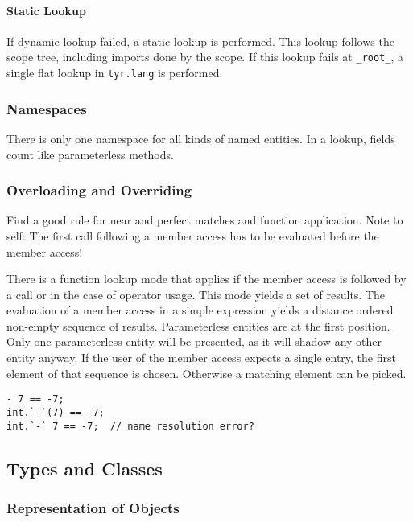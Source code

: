 \paragraph{Static Lookup} If dynamic lookup failed, a static lookup is performed.
This lookup follows the scope tree, including imports done by the scope.
If this lookup fails at \texttt{\_root\_}, a single flat lookup in \texttt{tyr.lang} is performed.


\subsubsection{Namespaces}

There is only one namespace for all kinds of named entities.
In a lookup, fields count like parameterless methods.


\subsubsection{Overloading and Overriding}

Find a good rule for near and perfect matches and function application.
Note to self: The first call following a member access has to be evaluated before the member access!

There is a function lookup mode that applies if the member access is followed by a call or in the case of operator usage.
This mode yields a set of results. 
The evaluation of a member access in a simple expression yields a distance ordered non-empty sequence of results.
Parameterless entities are at the first position.
Only one parameterless entity will be presented, as it will shadow any other entity anyway.
If the user of the member access expects a single entry, the first element of that sequence is chosen.
Otherwise a matching element can be picked.


\begin{lstlisting}[language=tyr]
- 7 == -7;
int.`-`(7) == -7;
int.`-` 7 == -7;  // name resolution error?
\end{lstlisting}


\subsection{Types and Classes}

\subsubsection{Representation of Objects}

